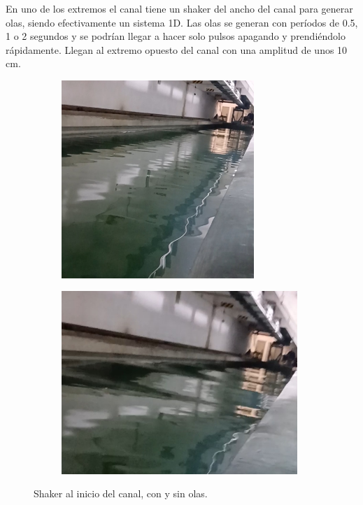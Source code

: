 En uno de los extremos el canal tiene un shaker del ancho del canal para generar olas, siendo efectivamente un sistema 1D. Las olas se generan con períodos de 0.5, 1 o 2 segundos y se podrían llegar a hacer solo pulsos apagando y prendiéndolo rápidamente. Llegan al extremo opuesto del canal con una amplitud de unos 10 cm. 

\begin{figure}[!ht]
	\begin{minipage}[c]{0.5\textwidth}
			\begin{subfigure}{\textwidth}
					\centering
					\includegraphics[width=0.8\textwidth]{Figures/16_06_2025/Shaker.jpg}
					\captionsetup{width=0.8\textwidth}
					\subcaption{}
				\end{subfigure}
		\end{minipage}\begin{minipage}[c]{0.49\textwidth}
			\begin{subfigure}{\textwidth}
					\centering
					\includegraphics[width=0.98\textwidth]{Figures/16_06_2025/Olas.jpg}
					\captionsetup{width=0.8\textwidth}
					\subcaption{}
				\end{subfigure}
		\end{minipage}
	\caption{Shaker al inicio del canal, con y sin olas.}
	\label{fig:shaker}
\end{figure}

